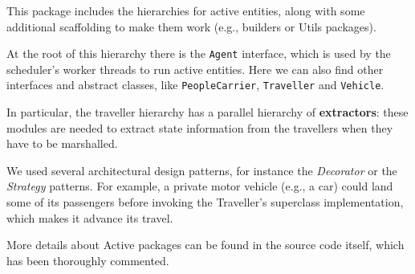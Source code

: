 This package includes the hierarchies for active entities, along with some
additional scaffolding to make them work (e.g., builders or Utils packages).

At the root of this hierarchy there is the \texttt{Agent} interface, which is
used by the scheduler's worker threads to run active entities. Here we can also
find other interfaces and abstract classes, like \texttt{PeopleCarrier},
\texttt{Traveller} and \texttt{Vehicle}.

In particular, the traveller hierarchy has a parallel hierarchy of
\textbf{extractors}: these modules are needed to extract state information from
the travellers when they have to be marshalled.

We used several architectural design patterns, for instance the
\textit{Decorator} or the \textit{Strategy} patterns. For example, a private
motor vehicle (e.g., a car) could land some of its passengers before invoking
the Traveller's superclass implementation, which makes it advance its travel.

More details about Active packages can be found in the source code itself,
which has been thoroughly commented.
